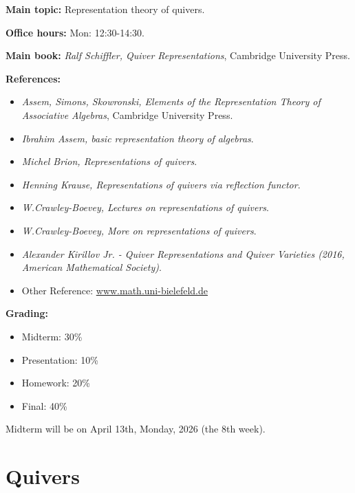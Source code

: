 \documentclass[11pt, a4paper]{report}
\begin{document}
\begin{tcolorbox}[
    enhanced,
    title=\textbf{Course Information},
    colframe=TopicColor,
    colback=TopicBg,
    coltitle=white,
    boxrule=0.5pt,
    leftrule=2pt,
    sharp corners=downhill,
    drop shadow=black!5!white
]
\textbf{\textcolor{TopicColor}{Main topic:}} Representation theory of quivers.

\textbf{\textcolor{TopicColor}{Office hours:}} Mon: 12:30-14:30.

\textbf{\textcolor{TopicColor}{Main book:}} \textit{Ralf Schiffler, Quiver Representations}, Cambridge University Press.

\textbf{\textcolor{TopicColor}{References:}}
\begin{itemize}[leftmargin=*, nosep, label=\textcolor{TopicColor}{$\bullet$}]
    \item \textit{Assem, Simons, Skowronski, Elements of the Representation Theory of Associative Algebras}, Cambridge University Press.
    \item \textit{Ibrahim Assem, basic representation theory of algebras}.
    \item \textit{Michel Brion, Representations of quivers}.
    \item \textit{Henning Krause, Representations of quivers via reflection functor}.
    \item \textit{W.Crawley-Boevey, Lectures on representations of quivers}.
    \item \textit{W.Crawley-Boevey, More on representations of quivers}.
    \item \textit{Alexander Kirillov Jr. - Quiver Representations and Quiver Varieties (2016, American Mathematical Society)}.
    \item Other Reference: \url{www.math.uni-bielefeld.de}
\end{itemize}
\textbf{\textcolor{TopicColor}{Grading:}}
\begin{itemize}[leftmargin=*, nosep, label=\textcolor{TopicColor}{$\bullet$}]
    \item Midterm: 30\%
    \item Presentation: 10\%
    \item Homework: 20\%
    \item Final: 40\%
\end{itemize}
Midterm will be on April 13th, Monday, 2026 (the 8th week). 
\end{tcolorbox}

\section{Quivers}
\end{document}
